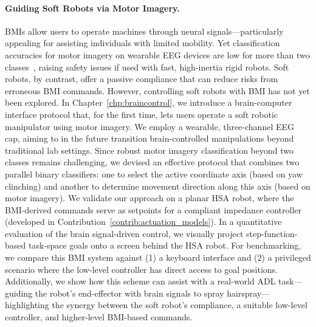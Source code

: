 \paragraph{Guiding Soft Robots via Motor Imagery.}
\glspl{BMI} allow users to operate machines through neural signals—particularly appealing for assisting individuals with limited mobility. Yet classification accuracies for motor imagery on wearable EEG devices are low for more than two classes~\cite{arpaia2022non, lee2024noir}, raising safety issues if used with fast, high-inertia rigid robots. Soft robots, by contrast, offer a passive compliance that can reduce risks from erroneous \gls{BMI} commands. However, controlling soft robots with \gls{BMI} has not yet been explored.
%
In Chapter~\ref{chp:braincontrol}, we introduce a brain-computer interface protocol that, for the first time, lets users operate a soft robotic manipulator using motor imagery. We employ a wearable, three-channel \gls{EEG} cap, aiming to in the future transition brain-controlled manipulations beyond traditional lab settings. Since robust motor imagery classification beyond two classes remains challenging, we devised an effective protocol that combines two parallel binary classifiers: one to select the active coordinate axis (based on yaw clinching) and another to determine movement direction along this axis (based on motor imagery). We validate our approach on a planar \gls{HSA} robot, where the \gls{BMI}-derived commands serve as setpoints for a compliant impedance controller (developed in Contribution~\ref{contrib:actuation_models}).
In a quantitative evaluation of the brain signal-driven control, we visually project step-function-based task-space goals onto a screen behind the \gls{HSA} robot.
% 
For benchmarking, we compare this \gls{BMI} system against (1) a keyboard interface and (2) a privileged scenario where the low-level controller has direct access to goal positions. Additionally, we show how this scheme can assist with a real-world \gls{ADL} task—guiding the robot’s end-effector with brain signals to spray hairspray—highlighting the synergy between the soft robot’s compliance, a suitable low-level controller, and higher-level \gls{BMI}-based commands.

